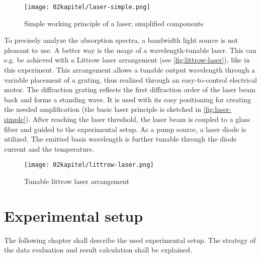 \begin{figure}[!htb]
    \centering
    \texttt{[image: 02kapitel/laser-simple.png]}
    \caption[Components and working principles of a laser]{Simple working principle of a laser; simplified components \autocite{klevanskyTDLASTunableLaser2021}}
    \label{fig:laser-simple}
\end{figure}

To precisely analyze the absorption spectra, a bandwidth light source is not pleasant to use. A better way is the usage of a wavelength-tunable laser. This can e.g. be achieved with a Littrow laser arrangement (see \autoref{fig:littrow-laser}), like in this experiment. This arrangement allows a tunable output wavelength through a variable placement of a grating, thus realized through an easy-to-control electrical motor. The diffraction grating reflects the first diffraction order of the laser beam back and forms a standing wave. It is used with its easy positioning for creating the needed amplification (the basic laser principle is sketched in \autoref{fig:laser-simple}). After reaching the laser threshold, the laser beam is coupled to a glass fiber and guided to the experimental setup. As a pump source, a laser diode is utilized. The emitted basis wavelength is further tunable through the diode current and the temperature.

\begin{figure}[!htb]
    \centering
    \texttt{[image: 02kapitel/littrow-laser.png]}
    \caption[Tunable littrow laser arrangement]{Tunable littrow laser arrangement \autocite{klevanskyTDLASTunableLaser2021}}
    \label{fig:littrow-laser}
\end{figure}

\chapter{Experimental setup}
\label{chap:experimental}

The following chapter shall describe the used experimental setup. The strategy of the data evaluation and result calculation shall be explained.


